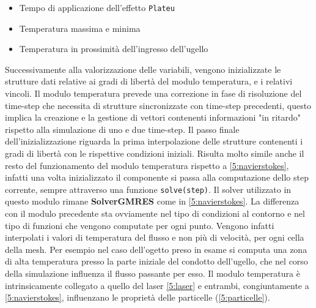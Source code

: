     \begin{itemize}
        \item Tempo di applicazione dell'effetto \texttt{Plateu}
        \item Temperatura massima e minima
        \item Temperatura in prossimità dell'ingresso dell'ugello
    \end{itemize}

    Successivamente alla valorizzazione delle variabili, vengono inizializzate le strutture dati relative ai gradi di libertà del modulo temperatura, e i relativi vincoli.
    Il modulo temperatura prevede una correzione in fase di risoluzione del time-step che necessita di strutture sincronizzate con time-step precedenti, questo implica la creazione e la gestione di
    vettori contenenti informazioni "in ritardo" rispetto alla simulazione di uno e due time-step.
    Il passo finale dell'inizializzazione riguarda la prima interpolazione delle strutture contenenti i gradi di libertà con le rispettive condizioni iniziali.
    Risulta molto simile anche il resto del funzionamento del modulo temperatura rispetto a \ref*{5:navierstokes}, infatti una volta inizializzato il componente si passa
    alla computazione dello step corrente, sempre attraverso una funzione \texttt{solve(step)}. Il solver utilizzato in questo modulo rimane \textbf{SolverGMRES} come in \ref*{5:navierstokes}.
    La differenza con il modulo precedente sta ovviamente nel tipo di condizioni al contorno e nel tipo di funzioni che vengono computate per ogni punto.
    Vengono infatti interpolati i valori di temperatura del flusso e non più di velocità, per ogni cella della mesh. Per esempio nel caso dell'ogetto preso in esame si computa una zona di alta temperatura presso
    la parte iniziale del condotto dell'ugello, che nel corso della simulazione influenza il flusso passante per esso.
    Il modulo temperatura è intrinsicamente collegato a quello del laser \ref*{5:laser} e entrambi, congiuntamente a \ref*{5:navierstokes}, influenzano le proprietà delle particelle (\ref*{5:particelle}).

